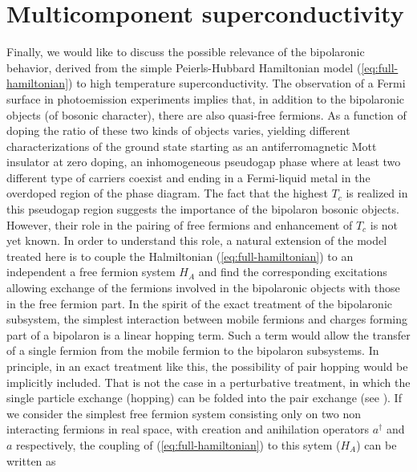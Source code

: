 \section{Multicomponent superconductivity}

Finally, we would like to discuss the possible relevance of the bipolaronic behavior, derived from the simple Peierls-Hubbard Hamiltonian model (\ref{eq:full-hamiltonian}) to high temperature superconductivity. 
The observation of a Fermi surface in photoemission experiments \cite{Ding1996,Hussey2003} implies that, in addition to the bipolaronic objects (of bosonic character), there are also quasi-free fermions. 
As a function of doping the ratio of these two kinds of objects varies, yielding different characterizations of the ground state starting as an antiferromagnetic Mott insulator at zero doping, an inhomogeneous pseudogap phase where at least two different type of carriers coexist and ending in a Fermi-liquid metal in the overdoped region of the phase diagram. 
The fact that the highest $T_c$  is realized in this pseudogap region suggests the importance of the bipolaron bosonic objects. 
However, their role in the pairing of free fermions and enhancement of $T_c$ is not yet known. 
In order to understand this role, a natural extension of the model treated here is to couple the Halmiltonian  (\ref{eq:full-hamiltonian}) to an independent a free fermion system $H_A$ and find the corresponding excitations allowing exchange of the fermions involved in the bipolaronic objects with those in the free fermion part. 
In the spirit of the exact treatment of the bipolaronic subsystem, the simplest interaction between mobile fermions and charges forming part of a bipolaron is a linear hopping term. 
Such a term would allow the transfer of a single fermion from the mobile fermion to the bipolaron subsystems. 
In principle, in an exact treatment like this, the possibility of pair hopping would be implicitly included. 
That is not the case in a perturbative treatment, in which the single particle exchange (hopping) can be folded into the pair exchange (see \cite{Bar-Yam1991}).
If we consider the simplest free fermion system consisting only on two non interacting fermions in real space, with creation and anihilation operators $a^\dagger$ and $a$ respectively, the coupling of (\ref{eq:full-hamiltonian}) to this sytem ($H_A$) can be written as

